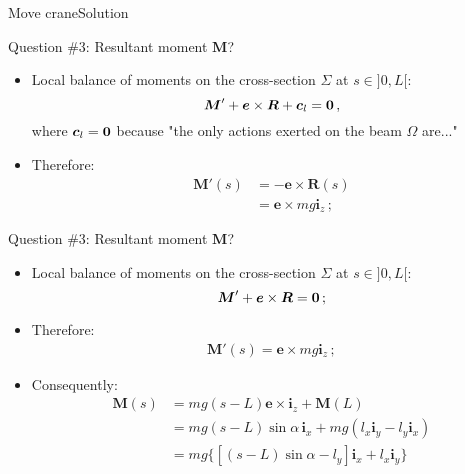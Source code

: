 \documentclass{beamer}
\newcommand{\cj}{c}
\newcommand{\cv}{{\boldsymbol\cj}}
\newcommand{\xj}{x}
\newcommand{\yj}{y}
\newcommand{\zj}{z}
\newcommand{\ej}{e}
\renewcommand{\ij}{i}
\newcommand{\ev}{{\boldsymbol\ej}}
\newcommand{\iv}{{\boldsymbol\ij}}
\newcommand{\medium}{\Omega}
\newcommand{\Fresj}{R}
\newcommand{\Mresj}{M}
\newcommand{\Fres}{{\boldsymbol\Fresj}}
\newcommand{\Mres}{{\boldsymbol\Mresj}}
\newcommand{\bzero}{{\bf 0}}
\begin{document}
\begin{frame}{Move crane}{Solution}

\begin{overprint}

\vskip-20pt
\begin{exampleblock}{Question \#3: Resultant moment $\Mres$?}
\begin{itemize}
\item Local balance of moments on the cross-section $\Sigma$ at $s\in]0,L[$:
\begin{displaymath}
\Mres'+\ev\times\Fres+\cv_l=\bzero\,,
\end{displaymath}
where $\cv_l=\bzero$ because "the only actions exerted on the beam $\medium$ are..."
\item Therefore:
\begin{displaymath}
\begin{split}
\Mres'(s) &=-\ev\times\Fres(s) \\
&=\ev\times mg\iv_\zj\,;
\end{split}
\end{displaymath}
\end{itemize}
\end{exampleblock}

\vskip-20pt
\begin{exampleblock}{Question \#3: Resultant moment $\Mres$?}
\begin{itemize}
\item Local balance of moments on the cross-section $\Sigma$ at $s\in]0,L[$:
\begin{displaymath}
\Mres'+\ev\times\Fres=\bzero\,;
\end{displaymath}
\item Therefore:
\begin{displaymath}
\begin{split}
\Mres'(s)=\ev\times mg\iv_\zj\,;
\end{split}
\end{displaymath}
\item Consequently:
\begin{displaymath}
\begin{split}
\Mres(s) &=mg(s-L)\ev\times\iv_\zj+\Mres(L) \\
&=mg(s-L)\sin\alpha\,\iv_\xj+mg(l_\xj\iv_\yj-l_\yj\iv_\xj) \\
&=mg\{[(s-L)\sin\alpha-l_\yj]\iv_\xj+l_\xj\iv_\yj\}
\end{split}
\end{displaymath}
\end{itemize}
\end{exampleblock}


\end{overprint}
\end{frame}
\end{document}
